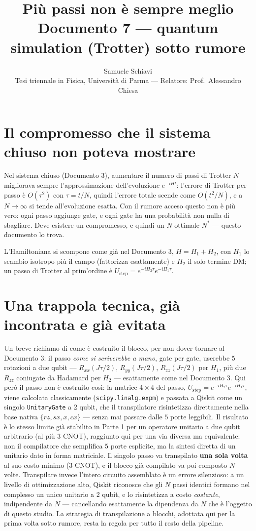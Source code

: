 \documentclass[11pt,a4paper]{article}
\title{\bfseries Più passi non è sempre meglio\\[2pt]
\large Documento 7 --- quantum simulation (Trotter) sotto rumore}
\author{Samuele Schiavi \\ \small Tesi triennale in Fisica, Università di Parma
--- Relatore: Prof.\ Alessandro Chiesa}
\date{}
\begin{document}
\maketitle
\thispagestyle{fancy}

\section{Il compromesso che il sistema chiuso non poteva mostrare}

Nel sistema chiuso (Documento 3), aumentare il numero di passi di Trotter $N$
migliorava sempre l'approssimazione dell'evoluzione $e^{-iHt}$: l'errore di
Trotter per passo è $O(\tau^2)$ con $\tau=t/N$, quindi l'errore totale scende
come $O(t^2/N)$, e a $N\to\infty$ si tende all'evoluzione esatta. Con il
rumore acceso questo non è più vero: ogni passo aggiunge gate, e ogni gate ha
una probabilità non nulla di sbagliare. Deve esistere un compromesso, e quindi
un $N$ ottimale $N^*$ --- questo documento lo trova.

L'Hamiltoniana si scompone come già nel Documento 3, $H=H_1+H_2$, con $H_1$ lo
scambio isotropo più il campo (fattorizza esattamente) e $H_2$ il solo
termine DM; un passo di Trotter al prim'ordine è
$U_\text{step}=e^{-iH_2\tau}e^{-iH_1\tau}$.

\section{Una trappola tecnica, già incontrata e già evitata}

Un breve richiamo di come è costruito il blocco, per non dover tornare al
Documento 3: il passo \emph{come si scriverebbe a mano}, gate per gate, userebbe
$5$ rotazioni a due qubit --- $R_{xx}(J\tau/2)$, $R_{yy}(J\tau/2)$,
$R_{zz}(J\tau/2)$ per $H_1$, più due $R_{zz}$ coniugate da Hadamard per $H_2$
--- esattamente come nel Documento 3. Qui però il passo non è costruito così:
la matrice $4\times4$ del passo, $U_\text{step}=e^{-iH_2\tau}e^{-iH_1\tau}$,
viene calcolata classicamente (\texttt{scipy.linalg.expm}) e passata a Qiskit
come un singolo \texttt{UnitaryGate} a 2 qubit, che il transpilatore
risintetizza direttamente nella base nativa $\{rz,sx,x,cx\}$ --- senza mai
passare dalle $5$ porte leggibili. Il risultato è lo stesso limite già
stabilito in Parte 1 per un operatore unitario a due qubit arbitrario (al più
$3$ CNOT), raggiunto qui per una via diversa ma equivalente: non il
compilatore che semplifica $5$ porte esplicite, ma la sintesi diretta di un
unitario dato in forma matriciale. Il singolo passo va transpilato
\textbf{una sola volta} al suo costo minimo (3 CNOT), e il blocco già
compilato va poi composto $N$ volte. Transpilare invece l'intero circuito
assemblato è un errore silenzioso: a un livello di ottimizzazione alto,
Qiskit riconosce che gli $N$ passi identici formano nel complesso un unico
unitario a 2 qubit, e lo risintetizza a costo \emph{costante}, indipendente
da $N$ --- cancellando esattamente la dipendenza da $N$ che è l'oggetto di
questo studio. La strategia di transpilazione a blocchi, adottata qui per la
prima volta sotto rumore, resta la regola per tutto il resto della pipeline.
\end{document}

